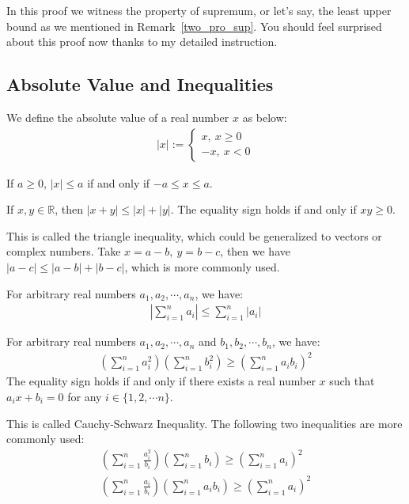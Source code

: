 \documentclass[a4paper]{ctexart}
\begin{document}
	\begin{myrmk}
		In this proof we witness the property of supremum, or let's say, the least upper bound as we mentioned in Remark~\ref{two_pro_sup}. You should feel surprised about this proof now thanks to my detailed instruction.
	\end{myrmk}
	\subsection{Absolute Value and Inequalities}
	\begin{mydef}
		We define the absolute value of a real number $x$ as below:
		\begin{align*}
			|x|:=\begin{cases}x,\ x\ge0
				\\ -x,\ x<0
			\end{cases}
		\end{align*}
	\end{mydef}
	\begin{mythm}
		If $a\ge 0$, $|x|\le a$ if and only if $-a\le x \le a$.
	\end{mythm}
	\begin{mythm}
		If $x,y\in \mathbb{R}$, then $|x+y| \le |x|+|y|$. The equality sign holds if and only if $xy\ge 0$.
	\end{mythm}
	\begin{myrmk}
		This is called the triangle inequality, which could be generalized to vectors or complex numbers. Take $x=a-b,\ y=b-c$, then we have $|a-c|\le |a-b|+|b-c|$, which is more commonly used.
	\end{myrmk}
	\begin{mythm}
		For arbitrary real numbers $a_1,a_2,\cdots,a_n$, we have:
		\begin{align*}
			\left|\sum_{i=1}^n a_i\right|\le \sum_{i=1}^n |a_i|
		\end{align*}
	\end{mythm}
	\begin{mythm}
		For arbitrary real numbers $a_1,a_2,\cdots,a_n$ and $b_1,b_2,\cdots,b_n$, we have:
		\begin{align*}
			\left(\sum_{i=1}^{n}a_i^2\right)\left(\sum_{i=1}^{n}b_i^2\right) \ge \left(\sum_{i=1}^{n}a_ib_i\right)^2
		\end{align*}
		The equality sign holds if and only if there exists a real number $x$ such that $a_ix+b_i=0$ for any $i\in \{1,2,\cdots n\}$.
	\end{mythm}
	\begin{myrmk}
		This is called Cauchy-Schwarz Inequality. The following two inequalities are more commonly used:
		\begin{align*}
			\left(\sum_{i=1}^{n}\frac{a_i^2}{b_i}\right)\left(\sum_{i=1}^{n}b_i\right) \ge \left(\sum_{i=1}^{n}a_i\right)^2\\
			\left(\sum_{i=1}^{n}\frac{a_i}{b_i}\right)\left(\sum_{i=1}^{n}a_ib_i\right) \ge \left(\sum_{i=1}^{n}a_i\right)^2
		\end{align*}
	\end{myrmk}
	\newpage
\end{document}
